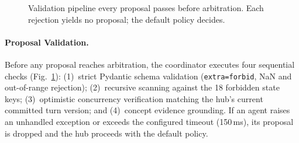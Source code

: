 \begin{figure}[tbp]
\centering
\resizebox{0.68\textwidth}{!}{}
\caption{Validation pipeline every proposal passes before arbitration. Each rejection yields no proposal; the default policy decides.}\label{fig:valid}
\end{figure}
\paragraph{Proposal Validation.} Before any proposal reaches arbitration, the coordinator executes four sequential checks (Fig.~\ref{fig:valid}): (1)~strict Pydantic schema validation (\texttt{extra=forbid}, NaN and out-of-range rejection); (2)~recursive scanning against the 18 forbidden state keys; (3)~optimistic concurrency verification matching the hub's current committed turn version; and (4)~concept evidence grounding. If an agent raises an unhandled exception or exceeds the configured timeout (150\,ms), its proposal is dropped and the hub proceeds with the default policy.
